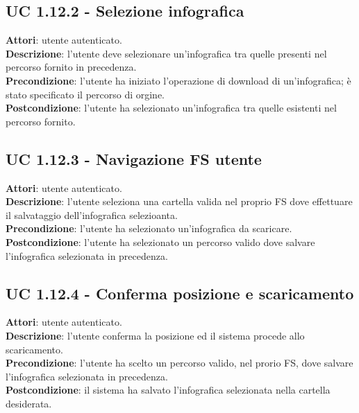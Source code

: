 	\subsection{UC 1.12.2 - Selezione infografica}{
		\label{uc1.12.2}
		\textbf{Attori}: utente autenticato. \\
		\textbf{Descrizione}: l'utente deve selezionare un'infografica tra quelle presenti nel percorso fornito in precedenza. \\
		\textbf{Precondizione}: l'utente ha iniziato l'operazione di download di un'infografica; è stato specificato il percorso di orgine.	\\
		\textbf{Postcondizione}: l'utente ha selezionato un'infografica tra quelle esistenti nel percorso fornito.	\\
		}
	\subsection{UC 1.12.3 - Navigazione FS utente}{
		\label{uc1.12.3}
		\textbf{Attori}: utente autenticato. \\
		\textbf{Descrizione}: l'utente seleziona una cartella valida nel proprio FS dove effettuare il salvataggio dell'infografica selezioanta. \\
		\textbf{Precondizione}: l'utente ha selezionato un'infografica da scaricare.	\\
		\textbf{Postcondizione}: l'utente ha selezionato un percorso valido dove salvare l'infografica selezionata in precedenza.	\\
		}
	\subsection{UC 1.12.4 - Conferma posizione e scaricamento}{
		\label{uc1.12.4}
		\textbf{Attori}: utente autenticato. \\
		\textbf{Descrizione}: l'utente conferma la posizione ed il sistema procede allo scaricamento. \\
		\textbf{Precondizione}: l'utente ha scelto un percorso valido, nel prorio FS, dove salvare l'infografica selezionata in precedenza.	\\
		\textbf{Postcondizione}: il sistema ha salvato l'infografica selezionata nella cartella desiderata.	\\
		}